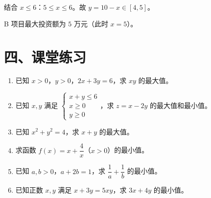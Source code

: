 \documentclass[12pt, a4paper]{ctexart}
\begin{document}
结合 $x \le 6$：$5 \le x \le 6$。故 $y = 10 - x \in [4, 5]$。

B 项目最大投资额为 $\boxed{5}$ 万元（此时 $x = 5$）。

\section*{\textcolor{tipgreen}{四、课堂练习}}

\begin{enumerate}
  \item 已知 $x > 0$，$y > 0$，$2x + 3y = 6$，求 $xy$ 的最大值。
  \item 已知 $x, y$ 满足 $\begin{cases} x + y \le 6 \\ x \ge 0 \\ y \ge 0 \end{cases}$，求 $z = x - 2y$ 的最大值和最小值。
  \item 已知 $x^2 + y^2 = 4$，求 $x + y$ 的最大值。
  \item 求函数 $f(x) = x + \dfrac{4}{x}$（$x > 0$）的最小值。
  \item 已知 $a, b > 0$，$a + 2b = 1$，求 $\dfrac{1}{a} + \dfrac{1}{b}$ 的最小值。
  \item 已知正数 $x, y$ 满足 $x + 3y = 5xy$，求 $3x + 4y$ 的最小值。
\end{enumerate}
\end{document}

